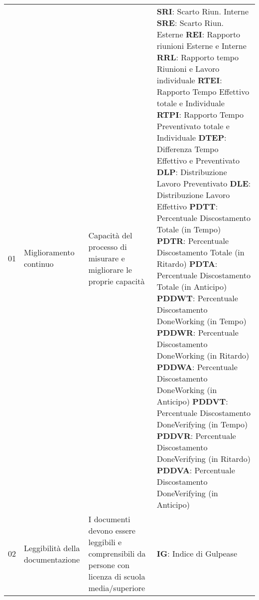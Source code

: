 \begin{longtable}{ 
		>{}p{} 
		>{}p{}
        >{}p{}
        >{\centering}p{} }
        01 & Miglioramento continuo & Capacità del processo di misurare e migliorare le proprie capacità & 
                         \textbf{SRI}: Scarto Riun. Interne \newline 
                         \textbf{SRE}: Scarto Riun. Esterne \newline
                         \textbf{REI}: Rapporto riunioni Esterne e Interne \newline
                         \textbf{RRL}: Rapporto tempo Riunioni e Lavoro individuale \newline
                         \textbf{RTEI}: Rapporto Tempo Effettivo totale e Individuale \newline
                         \textbf{RTPI}: Rapporto Tempo Preventivato totale e Individuale \newline
                         \textbf{DTEP}: Differenza Tempo Effettivo e Preventivato \newline 
                         \textbf{DLP}: Distribuzione Lavoro Preventivato \newline 
                         \textbf{DLE}: Distribuzione Lavoro Effettivo \newline
                         \textbf{PDTT}: Percentuale Discostamento Totale (in Tempo) \newline 
                         \textbf{PDTR}: Percentuale Discostamento Totale (in Ritardo) \newline 
                         \textbf{PDTA}: Percentuale Discostamento Totale (in Anticipo) \newline 
                         \textbf{PDDWT}: Percentuale Discostamento DoneWorking (in Tempo) \newline 
                         \textbf{PDDWR}: Percentuale Discostamento DoneWorking (in Ritardo) \newline 
                         \textbf{PDDWA}: Percentuale Discostamento DoneWorking (in Anticipo) \newline 
                         \textbf{PDDVT}: Percentuale Discostamento DoneVerifying (in Tempo) \newline
                         \textbf{PDDVR}: Percentuale Discostamento DoneVerifying (in Ritardo) \newline
                         \textbf{PDDVA}: Percentuale Discostamento DoneVerifying (in Anticipo)
                         \tabularnewline

        02 & Leggibilità della documentazione & I documenti devono essere leggibili e comprensibili da persone con licenza di scuola media/superiore & \textbf{IG}: Indice di Gulpease \tabularnewline


\end{longtable}
